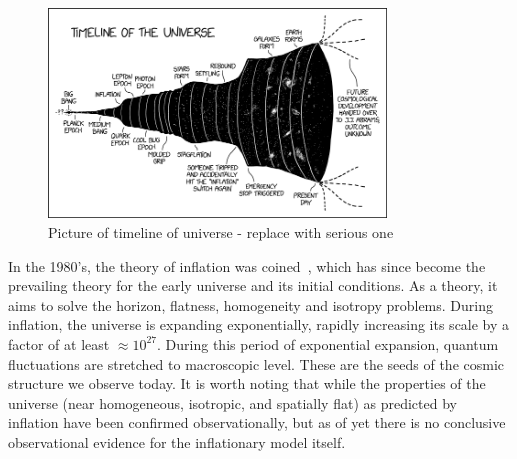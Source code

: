 \begin{figure}[ht]
	\centering
	\includegraphics[width=0.8\textwidth]{fig/timeline_of_the_universe.png}
	\caption{Picture of timeline of universe - replace with serious one}
	\label{fig:timelineuniverse}
\end{figure}
In the 1980's, the theory of inflation was coined~\cite{Guth:1980zm,Linde:1981mu,Albrecht:1982wi}, which has since become the prevailing theory for the early universe and its initial conditions. As a theory, it aims to solve the horizon, flatness, homogeneity and isotropy problems. During inflation, the universe is expanding exponentially, rapidly increasing its scale by a factor of at least $\approx 10^{27}$. During this period of exponential expansion, quantum fluctuations are stretched to macroscopic level. These are the seeds of the cosmic structure we observe today. It is worth noting that while the properties of the universe (near homogeneous, isotropic, and spatially flat) as predicted by inflation have been confirmed observationally, but as of yet there is no conclusive observational evidence for the inflationary model itself. 

